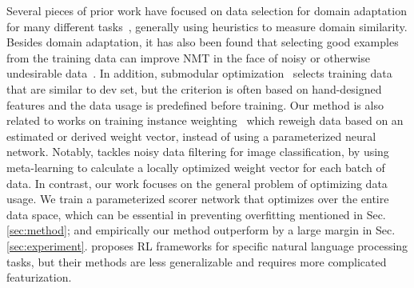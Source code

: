 Several pieces of prior work have focused on data selection for domain adaptation for many different tasks~\citep{moore2010intelligent,axelrod2011domain,domain_adapt_transfer,jiang-zhai-2007-instance,foster-etal-2010-discriminative,wang-etal-2017-instance}, generally using heuristics to measure domain similarity.
Besides domain adaptation, it has also been found that selecting good examples from the training data can improve NMT in the face of noisy or otherwise undesirable data~\citep{vyas-etal-2018-identifying,pham-etal-2018-fixing}. In addition, submodular optimization~\citep{submodular_mt,learn_mix_submodular} selects training data that are similar to dev set, but the criterion is often based on hand-designed features and the data usage is predefined before training. Our method is also related to works on training instance weighting~\citep{importance_weight,learn_reweight,jiang-zhai-2007-instance,domain_adapt_transfer} which reweigh data based on an estimated or derived weight vector, instead of using a parameterized neural network.
Notably, \citep{learn_reweight} tackles noisy data filtering for image classification, by using meta-learning to calculate a locally optimized weight vector for each batch of data. In contrast, our work focuses on the general problem of optimizing data usage. We train a parameterized scorer network that optimizes over the entire data space, which can be essential in preventing overfitting mentioned in Sec. \ref{sec:method}; and empirically our method outperform \cite{learn_reweight} by a large margin in Sec. \ref{sec:experiment}.
\citep{reinforce_cotrain,rl_nmt,learn_active_learn} proposes RL frameworks for specific natural language processing tasks, but their methods are less generalizable and requires more complicated featurization.   
